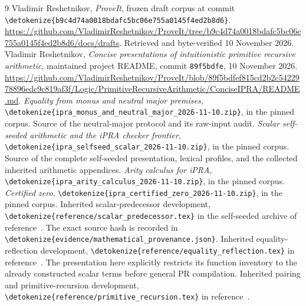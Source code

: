 \documentclass[11pt]{article}
\theoremstyle{definition}\newtheorem{definition}[theorem]{Definition}
\newcommand{\file}[1]{\expandafter\nolinkurl\expandafter{\detokenize{#1}}}
\begin{document}
\begin{thebibliography}{9}
 Vladimir Reshetnikov, \emph{ProveIt}, frozen draft corpus
at commit \file{b9c4d74a0018bdafc5bc06e755a0145f4ed2b8d6}.
\url{https://github.com/VladimirReshetnikov/ProveIt/tree/b9c4d74a0018bdafc5bc06e755a0145f4ed2b8d6/docs/drafts}.
Retrieved and byte-verified 10 November 2026.
 Vladimir Reshetnikov, \emph{Concise presentations of
intuitionistic primitive recursive arithmetic}, maintained project README,
commit \texttt{89f5bdfe}, 10 November 2026.
\url{https://github.com/VladimirReshetnikov/ProveIt/blob/89f5bdfef815cd2b2c5422978896edc9c819af3f/Logic/PrimitiveRecursiveArithmetic/ConciseIPRA/README.md}.
 \emph{Equality from monus and neutral major premises},
\file{ipra_monus_and_neutral_major_2026-11-10.zip}, in the pinned corpus.
Source of the neutral-major protocol and its raw-input audit.
 \emph{Scalar self-seeded arithmetic and the iPRA checker
frontier}, \file{ipra_selfseed_scalar_2026-11-10.zip}, in the pinned corpus.
Source of the complete self-seeded presentation, lexical profiles,
and the collected inherited arithmetic appendices.
 \emph{Arity calculus for iPRA},
\file{ipra_arity_calculus_2026-11-10.zip}, in the pinned corpus.
 \emph{Certified zero},
\file{ipra_certified_zero_2026-11-10.zip}, in the pinned corpus.
 Inherited scalar-predecessor development,
\file{reference/scalar_predecessor.tex} in the self-seeded archive
of reference~\cite{selfseed}. The exact source hash is recorded in
\file{evidence/mathematical_provenance.json}.
 Inherited equality-reflection development,
\file{reference/equality_reflection.tex} in reference~\cite{selfseed}.
The presentation here explicitly restricts its function inventory to the
already constructed scalar terms before general PR compilation.
 Inherited pairing and primitive-recursion development,
\file{reference/primitive_recursion.tex} in reference~\cite{selfseed}.
\end{thebibliography}
\end{document}
